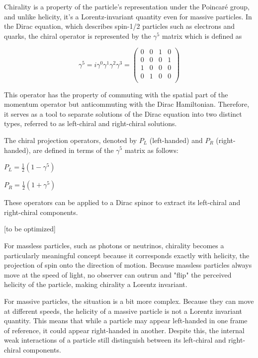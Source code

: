 Chirality is a property of the particle's representation under the Poincaré group, and unlike helicity, it's a Lorentz-invariant quantity even for massive particles. In the Dirac equation, which describes spin-1/2 particles such as electrons and quarks, the chiral operator is represented by the $\gamma^5$ matrix which is defined as

\begin{equation}
 \gamma^5 = i\gamma^0\gamma^1\gamma^2\gamma^3 = \begin{pmatrix}
    0 & 0 & 1 & 0 \\
    0 & 0 & 0 & 1 \\
    1 & 0 & 0 & 0 \\
    0 & 1 & 0 & 0 \\
\end{pmatrix}   
\end{equation}

This operator has the property of commuting with the spatial part of the momentum operator but anticommuting with the Dirac Hamiltonian. Therefore, it serves as a tool to separate solutions of the Dirac equation into two distinct types, referred to as left-chiral and right-chiral solutions.


The chiral projection operators, denoted by $P_L$ (left-handed) and $P_R$ (right-handed), are defined in terms of the $\gamma^5$ matrix as follows:
\begin{center}
$P_L = \frac{1}{2}(1 - \gamma^5)$

$P_R = \frac{1}{2}(1 + \gamma^5)$    
\end{center}

These operators can be applied to a Dirac spinor to extract its left-chiral and right-chiral components. 

[to be optimized]

For massless particles, such as photons or neutrinos, chirality becomes a particularly meaningful concept because it corresponds exactly with helicity, the projection of spin onto the direction of motion. Because massless particles always move at the speed of light, no observer can outrun and "flip" the perceived helicity of the particle, making chirality a Lorentz invariant.

For massive particles, the situation is a bit more complex. Because they can move at different speeds, the helicity of a massive particle is not a Lorentz invariant quantity. This means that while a particle may appear left-handed in one frame of reference, it could appear right-handed in another. Despite this, the internal weak interactions of a particle still distinguish between its left-chiral and right-chiral components.

